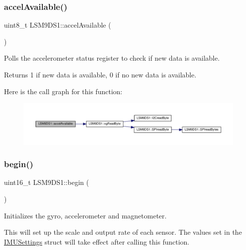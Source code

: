 \subsubsection{\texorpdfstring{accel\+Available()}{accelAvailable()}}
{\footnotesize\ttfamily uint8\+\_\+t L\+S\+M9\+D\+S1\+::accel\+Available (\begin{DoxyParamCaption}{ }\end{DoxyParamCaption})}



Polls the accelerometer status register to check if new data is available. 

\begin{DoxyReturn}{Returns}
1 if new data is available, 0 if no new data is available. 
\end{DoxyReturn}
Here is the call graph for this function\+:
\nopagebreak
\begin{figure}[H]
\begin{center}
\leavevmode
\includegraphics[width=350pt]{classLSM9DS1_a515ce6f5c199a86c6aa5be353b2a3a13_cgraph}
\end{center}
\end{figure}
\mbox{\label{classLSM9DS1_a8728e560c76bd120b3711af15a6ecbd6}} 
\subsubsection{\texorpdfstring{begin()}{begin()}}
{\footnotesize\ttfamily uint16\+\_\+t L\+S\+M9\+D\+S1\+::begin (\begin{DoxyParamCaption}{ }\end{DoxyParamCaption})}



Initializes the gyro, accelerometer and magnetometer. 

This will set up the scale and output rate of each sensor. The values set in the \hyperlink{structIMUSettings}{I\+M\+U\+Settings} struct will take effect after calling this function.

